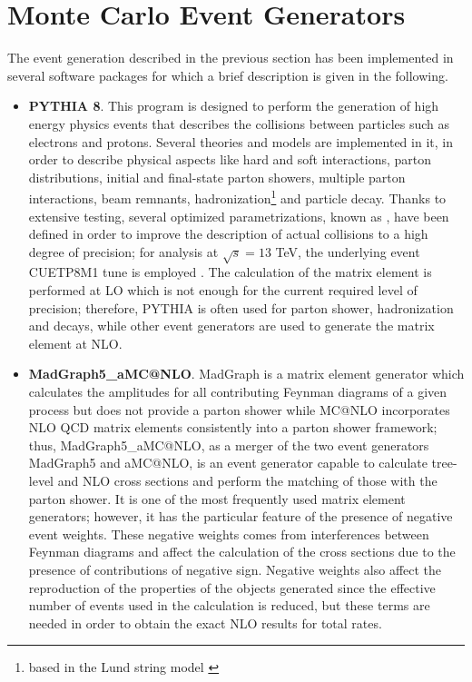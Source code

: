 \section{Monte Carlo Event Generators}

The event generation described in the previous section has been implemented in several software packages for which a brief description is given in the following. 

\begin{itemize}

\item \textbf{PYTHIA 8}. This program is designed to perform the generation of high energy physics events that describes the collisions between particles such as electrons and protons. Several theories and models are implemented in it, in order to describe physical aspects like hard and soft interactions, parton distributions, initial and final-state parton showers, multiple parton interactions, beam remnants, hadronization\footnote{based in the Lund string model \cite{lund}} and particle decay. Thanks to extensive testing, several optimized parametrizations, known as , have been defined in order to improve the description of actual collisions to a high degree of precision; for analysis at $\sqrt{s}=13$ TeV, the underlying event CUETP8M1 tune is employed \cite{tune}.  The calculation of the matrix element is performed at LO which is not enough for the current required level of precision; therefore, PYTHIA is often used for parton shower, hadronization and decays, while other event generators are used to generate the matrix element at NLO.
\item \textbf{MadGraph5\_aMC@NLO}. MadGraph is a matrix element generator which calculates the amplitudes for all contributing Feynman diagrams of a given process but does not provide a parton shower while MC@NLO incorporates NLO QCD matrix elements consistently into a parton shower framework; thus, MadGraph5\_aMC@NLO, as a merger of the two event generators MadGraph5 and aMC@NLO, is an event generator capable to calculate tree-level and NLO cross sections and perform the matching of those with the parton shower. It is one of the most frequently used matrix element generators; however, it has the particular feature of the presence of negative event weights. These negative weights comes from interferences between Feynman diagrams and affect the calculation of the cross sections due to the presence of contributions of negative sign. Negative weights also affect the reproduction of the properties of the objects generated since the effective number of events used in the calculation is reduced, but these terms are needed in order to obtain the exact NLO results for total rates. \cite{madgraph}  
  

\end{itemize}
